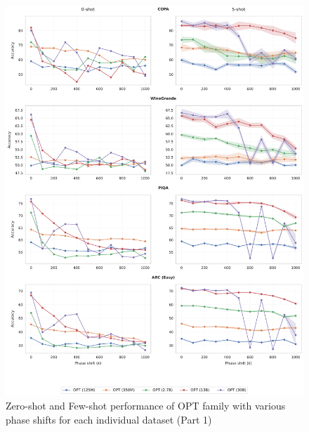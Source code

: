 \documentclass[letterpaper, 12pt]{report}
\begin{document}
\begin{figure}
    \centering
    \includegraphics[width=\textwidth]{figs/pos/v2_prompt_phase_shift_all_ds_part0.pdf}
    \caption{Zero-shot and Few-shot performance of OPT family with various phase shifts for each individual dataset (Part 1)}
    \label{fig:propmt_all_ds_part0}
\end{figure}
\end{document}
